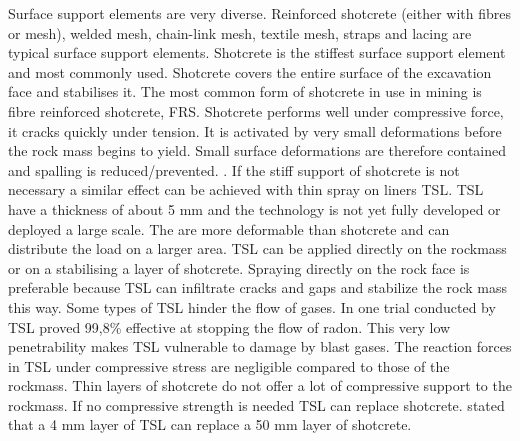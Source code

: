 

Surface support elements are very diverse. 
Reinforced shotcrete (either with fibres or mesh), welded mesh, chain-link mesh, textile mesh, straps and lacing are typical surface support elements. %
Shotcrete is the stiffest surface support element and most commonly used. \autocite[4.38]{canada96} Shotcrete covers the entire surface of the excavation face and stabilises it. The most common form of shotcrete in use in mining is fibre reinforced shotcrete, FRS. Shotcrete performs well under compressive force, it cracks quickly under tension. It is activated by very small deformations before the rock mass begins to yield. \autocite[578]{sme11} Small surface deformations are therefore contained and spalling is reduced/prevented. \autocite[585]{sme11}
 \autocite[3]{Villa14}. If the stiff support of shotcrete is not necessary a similar effect can be achieved with thin spray on liners TSL. \autocite[22]{guler01} TSL have a thickness of about 5 mm and the technology is not yet fully developed or deployed a large scale. \autocite[591]{sme11}
The are more deformable than shotcrete and can distribute the load on a larger area. \autocite[58]{Guner18}   TSL can be applied directly on the rockmass or on a stabilising a layer of shotcrete. Spraying directly on the rock face is preferable because TSL can infiltrate cracks and gaps and stabilize the rock mass this way. \autocite[113]{archibald92} Some types of TSL hinder the flow of gases. In one trial conducted by \textcite[13]{archibald97} TSL proved 99,8\% effective at stopping the flow of radon. This very low penetrability makes TSL vulnerable to damage by blast gases. \autocite[19]{archibald97}
The reaction forces in TSL under compressive stress are negligible compared to those of the rockmass. Thin layers of shotcrete do not offer a lot of compressive support to the rockmass. If no compressive strength is needed TSL can replace shotcrete. \textcite[99]{komurlu17} stated that a 4 mm layer of TSL can replace a 50 mm layer of shotcrete.
